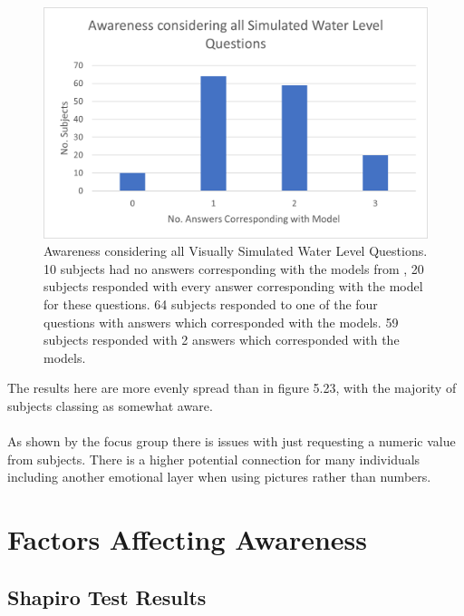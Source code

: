 \begin{figure}[H]
    \centering
    \includegraphics{fig_results/Awareness_ all_simulation_pictures_qs.png}
    \caption{Awareness considering all Visually Simulated Water Level Questions. 10 subjects had no answers corresponding with the models from \cite{kartverket_se_2020}, 20 subjects responded with every answer corresponding with the model for these questions. 64 subjects responded to one of the four questions with answers which corresponded with the models. 59 subjects responded with 2 answers which corresponded with the models. }
    \label{fig:aware_all}
\end{figure}


The results here are more evenly spread than in figure 5.23, with the majority of subjects classing as somewhat aware.
\paragraph{}
 


\paragraph{}
As shown by the focus group there is issues with just requesting a numeric value from subjects. There is a higher potential connection for many individuals including another emotional layer when using pictures rather than numbers. 

\section{Factors Affecting Awareness}
  

\subsection{Shapiro Test Results}

